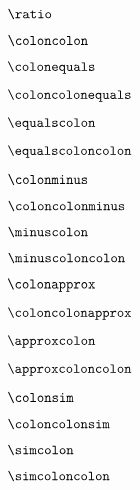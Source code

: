 \documentclass{article}
\begin{document}
$\ratio$\par
$\coloncolon$\par
$\colonequals$\par
$\coloncolonequals$\par
$\equalscolon$\par
$\equalscoloncolon$\par
$\colonminus$\par
$\coloncolonminus$\par
$\minuscolon$\par
$\minuscoloncolon$\par
$\colonapprox$\par
$\coloncolonapprox$\par
$\approxcolon$\par
$\approxcoloncolon$\par
$\colonsim$\par
$\coloncolonsim$\par
$\simcolon$\par
$\simcoloncolon$\par
\end{document}
